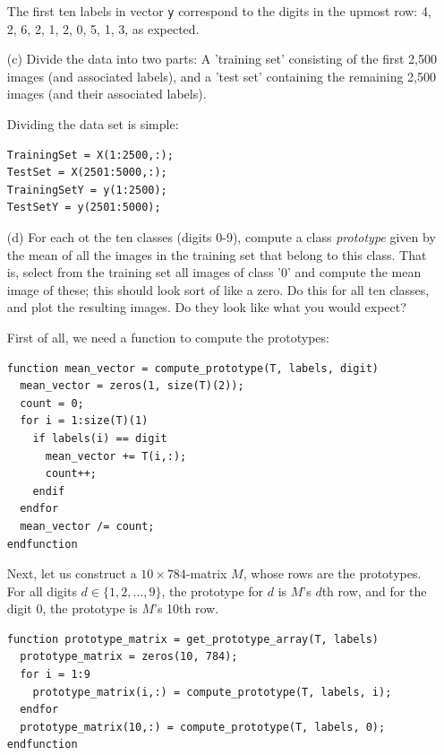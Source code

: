 \documentclass[10pt]{article}
\begin{document}
\begin{itemize}
The first ten labels in vector \texttt{y} correspond to the digits in the upmost row:  4, 2, 6, 2, 1, 2, 0, 5, 1, 3, as expected.

\color{blue}
\item[(c)] Divide the data into two parts: A 'training set' consisting of the first 2,500 images (and associated labels), and a 'test set' containing the remaining 2,500 images (and their associated labels).

\color{black}
Dividing the data set is simple:
\begin{verbatim}
TrainingSet = X(1:2500,:);
TestSet = X(2501:5000,:);
TrainingSetY = y(1:2500);
TestSetY = y(2501:5000);
\end{verbatim}

\color{blue}
\item[(d)] For each ot the ten classes (digits 0-9), compute a class \textit{prototype} given by the mean of all the images in the training set that belong to this class. That is, select from the training set all images of class '0' and compute the mean image of these; this should look sort of like a zero. Do this for all ten classes, and plot the resulting images. Do they look like what you would expect?

\color{black}
First of all, we need a function to compute the prototypes:
\begin{verbatim}
function mean_vector = compute_prototype(T, labels, digit)
  mean_vector = zeros(1, size(T)(2));
  count = 0;
  for i = 1:size(T)(1)
    if labels(i) == digit
      mean_vector += T(i,:);
      count++;
    endif
  endfor
  mean_vector /= count;
endfunction
\end{verbatim}
Next, let us construct a $10 \times 784$-matrix $M$, whose rows are the prototypes. For all digits $d \in \{ 1, 2, \dots, 9 \}$, the prototype for $d$ is $M$'s $d$th row, and for the digit 0, the prototype is $M$'s 10th row.
\begin{verbatim}
function prototype_matrix = get_prototype_array(T, labels)
  prototype_matrix = zeros(10, 784);
  for i = 1:9
    prototype_matrix(i,:) = compute_prototype(T, labels, i);
  endfor
  prototype_matrix(10,:) = compute_prototype(T, labels, 0);
endfunction
\end{verbatim}


\end{itemize}
\end{document}
